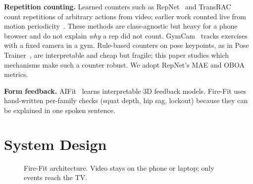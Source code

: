 \documentclass[conference]{IEEEtran}
\begin{document}
\textbf{Repetition counting.} Learned counters such as RepNet~\cite{dwibedi2020repnet}
and TransRAC~\cite{hu2022transrac} count repetitions of arbitrary actions from video;
earlier work counted live from motion periodicity~\cite{levy2015live}. These methods
are class-agnostic but heavy for a phone browser and do not explain \emph{why} a rep
did not count. GymCam~\cite{khurana2018gymcam} tracks exercises with a fixed camera in a
gym. Rule-based counters on pose keypoints, as in Pose Trainer~\cite{chen2020posetrainer},
are interpretable and cheap but fragile; this paper studies which mechanisms make such
a counter robust. We adopt RepNet's MAE and OBOA metrics.

\textbf{Form feedback.} AIFit~\cite{fieraru2021aifit} learns interpretable 3D feedback
models. Fire-Fit uses hand-written per-family checks (squat depth, hip sag, lockout)
because they can be explained in one spoken sentence.

\section{System Design}\label{sec:system}

\begin{figure}[t]
\centering
{}
\caption{Fire-Fit architecture. Video stays on the phone or laptop; only events reach the TV.}
\label{fig:arch}
\end{figure}
\end{document}
